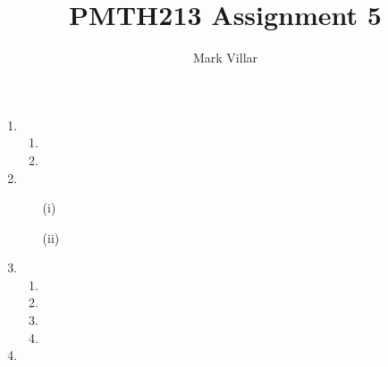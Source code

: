 \documentclass[12pt]{amsart}
\title{PMTH213 \hfill Assignment 5}
\author{Mark Villar}
\begin{document}
 

\maketitle 

\begin{enumerate}
	
	\item
		\begin{enumerate}
			\item

			\item
		\end{enumerate}
			
	\item 
		\begin{enumerate}
			\item[(i)]

			\item[(ii)]
		\end{enumerate}
		
	\item 
		\begin{enumerate}
			\item

			\item

			\item

			\item
		\end{enumerate}

	\item

\end{enumerate}
\end{document}
